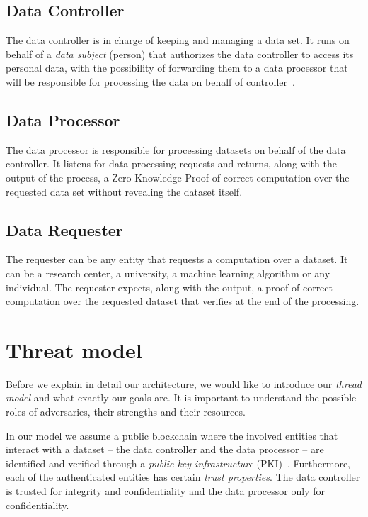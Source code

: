 \subsection{Data Controller}
\label{solution:entities:data_controller}

The data controller is in charge of keeping and managing a data set. It runs on behalf of a \textit{data subject} (person) that authorizes the data controller to access its personal data, with the possibility of forwarding them to a data processor that will be responsible for processing the data on behalf of controller~\cite{DBLP:journals/corr/NeisseSF17}.

\subsection{Data Processor}
\label{solution:entities:data_processor}

The data processor is responsible for processing datasets on behalf of the data controller. It listens for data processing requests and returns, along with the output of the process, a Zero Knowledge Proof of correct computation over the requested data set without revealing the dataset itself.

\subsection{Data Requester}
\label{solution:entities:data_req}

The requester can be any entity that requests a computation over a dataset. It can be a research center, a university, a machine learning algorithm or any individual. The requester expects, along with the output, a proof of correct computation over the requested dataset that verifies at the end of the processing.

\section{Threat model}
\label{solution:treat_model}

Before we explain in detail our architecture, we would like to introduce our \textit{thread model} and what exactly our goals are. It is important to understand the possible roles of adversaries, their strengths and their resources.

In our model we assume a public blockchain where the involved entities that interact with a dataset -- the data controller and the data processor -- are identified and verified through a \textit{public key infrastructure} (PKI)~\cite{adams_understanding_2003}. Furthermore, each of the authenticated entities has certain \textit{trust properties}. Τhe data controller is trusted for integrity and confidentiality and the data processor only for confidentiality.

